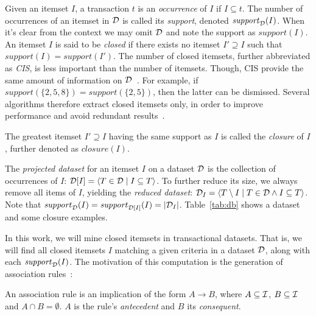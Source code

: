 Given an itemset $I$,
a transaction $t$ is an {\em occurrence} of $I$ if $I \subseteq t$.
The number of occurrences of an itemset in ${\cal D}$ is called its {\em support},
denoted $\mathit{support}_{\cal D}(I)$.
When it's clear from the context we may omit ${\cal D}$ and note the support as  $\mathit{support}(I)$.
An itemset $I$ is said to be {\em closed} if there exists no itemset $I'\supseteq I$
such that $\mathit{support}(I) = \mathit{support}(I')$.
The number of closed itemsets, further abbreviated as {\em CIS},
is less important than the number of itemsets.
Though, CIS provide the same amount of information on ${\cal D}$~\cite{PasquierICDT99}.
For example,
if $\mathit{support}(\{2,5,8\}) = \mathit{support}(\{2,5\})$,
then the latter can be dismissed.
Several algorithms therefore extract closed itemsets only,
in order to improve performance and avoid redundant results~\cite{PeiSIGMOD00,UnoFIMI04}.

\begin{definition}[Closure]
	The greatest itemset $I' \supseteq I$ having the same support as $I$ is called the {\em closure} of $I$,
	further denoted as $\mathit{closure}(I)$.
\end{definition}

The {\em projected dataset} for an itemset $I$ on a dataset ${\cal D}$ is the collection of occurrences of $I$:
${\cal D}[I] = \langle T \in {\cal D} \mid I \subseteq T \rangle$.
To further reduce its size, we always remove all items of $I$, yielding the {\em reduced dataset}:
${\cal D}_I = \langle T \setminus I \mid T \in {\cal D} \wedge I \subseteq T \rangle$.
Note that $\mathit{support}_{\cal D}(I) = \mathit{support}_{{\cal D}[I]}(I) = |{\cal D}_{I}|$.
Table~\ref{tab:db} shows a dataset and some closure examples.

In this work, we will mine closed itemsets in transactional datasets.
That is, we will find all closed itemsets $I$ matching a given criteria in a dataset $\cal D$,
along with each $\mathit{support}_{\cal D}(I)$.
The motivation of this computation is the generation of association rules~\cite{AgrawalSIGMOD93}:

\begin{definition}
	An association rule is an implication of the form $A \rightarrow B$,
	where $A \subseteq \cal I$, $B \subseteq \cal I$ and $A \cap B = \emptyset$.
	$A$ is the rule's {\em antecedent} and $B$ its {\em consequent}.
\end{definition}

